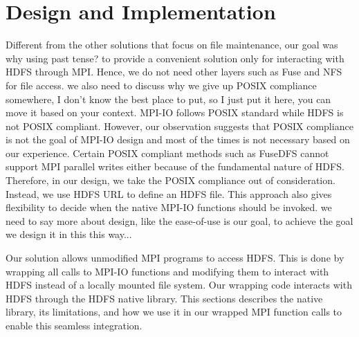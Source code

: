 

\section{Design and Implementation}
\label{sec:impl}
Different from the other solutions that focus on file maintenance, our goal was
{\color{red} why using past tense?} to provide a convenient solution only for
interacting with HDFS through MPI. Hence, we do not need other layers such as
Fuse and NFS for file access. {\color{red} we also need to discuss why we give up
POSIX compliance somewhere, I don't know the best place to put, so I just put it
here, you can move it based on your context.} MPI-IO follows POSIX standard
while HDFS is not POSIX compliant. However, our observation suggests that POSIX
compliance is not the goal of MPI-IO design and most of the times is not
necessary based on our experience. Certain POSIX compliant methods such as
FuseDFS cannot support MPI parallel writes either because of the fundamental
nature of HDFS. Therefore, in our design, we take the POSIX compliance out of
consideration. Instead, we use HDFS URL to define an HDFS file. This approach
also gives {\proj} flexibility to decide when the native MPI-IO functions should
be invoked. {\color{red} we need to say more about design, like the ease-of-use
is our goal, to achieve the goal we design it in this this way...}

Our solution allows unmodified
MPI programs to access HDFS.
This is done by wrapping all calls to MPI-IO
functions and modifying them to interact with HDFS instead of a locally mounted
file system. Our wrapping code interacts with HDFS through the HDFS native
library. This sections describes the native library, its limitations, and how we
use it in our wrapped MPI function calls to enable this seamless integration.

